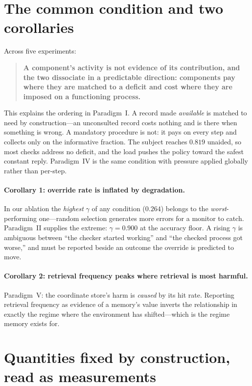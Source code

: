 \documentclass[11pt]{article}
\begin{document}
\section{The common condition and two corollaries}

Across five experiments:

\begin{quote}
\textbf{A component's activity is not evidence of its contribution, and the
two dissociate in a predictable direction: components pay where they are
matched to a deficit and cost where they are imposed on a functioning
process.}
\end{quote}

This explains the ordering in Paradigm~I. A record made \emph{available} is
matched to need by construction---an unconsulted record costs nothing and is
there when something is wrong. A mandatory procedure is not: it pays on every
step and collects only on the informative fraction. The subject reaches
$0.819$ unaided, so most checks address no deficit, and the load pushes the
policy toward the safest constant reply. Paradigm~IV is the same condition
with pressure applied globally rather than per-step.

\paragraph{Corollary 1: override rate is inflated by degradation.} In our
ablation the \emph{highest} $\gamma$ of any condition ($0.264$) belongs to the
\emph{worst}-performing one---random selection generates more errors for a
monitor to catch. Paradigm~II supplies the extreme: $\gamma = 0.900$ at the
accuracy floor. A rising $\gamma$ is ambiguous between ``the checker started
working'' and ``the checked process got worse,'' and must be reported beside
an outcome the override is predicted to move.

\paragraph{Corollary 2: retrieval frequency peaks where retrieval is most
harmful.} Paradigm~V: the coordinate store's harm is \emph{caused} by its hit
rate. Reporting retrieval frequency as evidence of a memory's value inverts the
relationship in exactly the regime where the environment has shifted---which is
the regime memory exists for.

\section{Quantities fixed by construction, read as measurements}
\label{sec:artifacts}
\end{document}

